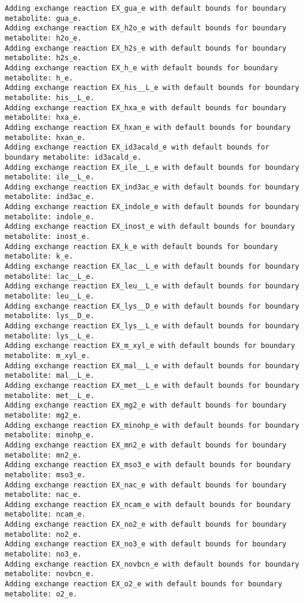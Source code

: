 \documentclass[
  letterpaper,
  DIV=11,
  numbers=noendperiod]{scrartcl}
\begin{document}
\begin{verbatim}
Adding exchange reaction EX_gua_e with default bounds for boundary metabolite: gua_e.
Adding exchange reaction EX_h2o_e with default bounds for boundary metabolite: h2o_e.
Adding exchange reaction EX_h2s_e with default bounds for boundary metabolite: h2s_e.
Adding exchange reaction EX_h_e with default bounds for boundary metabolite: h_e.
Adding exchange reaction EX_his__L_e with default bounds for boundary metabolite: his__L_e.
Adding exchange reaction EX_hxa_e with default bounds for boundary metabolite: hxa_e.
Adding exchange reaction EX_hxan_e with default bounds for boundary metabolite: hxan_e.
Adding exchange reaction EX_id3acald_e with default bounds for boundary metabolite: id3acald_e.
Adding exchange reaction EX_ile__L_e with default bounds for boundary metabolite: ile__L_e.
Adding exchange reaction EX_ind3ac_e with default bounds for boundary metabolite: ind3ac_e.
Adding exchange reaction EX_indole_e with default bounds for boundary metabolite: indole_e.
Adding exchange reaction EX_inost_e with default bounds for boundary metabolite: inost_e.
Adding exchange reaction EX_k_e with default bounds for boundary metabolite: k_e.
Adding exchange reaction EX_lac__L_e with default bounds for boundary metabolite: lac__L_e.
Adding exchange reaction EX_leu__L_e with default bounds for boundary metabolite: leu__L_e.
Adding exchange reaction EX_lys__D_e with default bounds for boundary metabolite: lys__D_e.
Adding exchange reaction EX_lys__L_e with default bounds for boundary metabolite: lys__L_e.
Adding exchange reaction EX_m_xyl_e with default bounds for boundary metabolite: m_xyl_e.
Adding exchange reaction EX_mal__L_e with default bounds for boundary metabolite: mal__L_e.
Adding exchange reaction EX_met__L_e with default bounds for boundary metabolite: met__L_e.
Adding exchange reaction EX_mg2_e with default bounds for boundary metabolite: mg2_e.
Adding exchange reaction EX_minohp_e with default bounds for boundary metabolite: minohp_e.
Adding exchange reaction EX_mn2_e with default bounds for boundary metabolite: mn2_e.
Adding exchange reaction EX_mso3_e with default bounds for boundary metabolite: mso3_e.
Adding exchange reaction EX_nac_e with default bounds for boundary metabolite: nac_e.
Adding exchange reaction EX_ncam_e with default bounds for boundary metabolite: ncam_e.
Adding exchange reaction EX_no2_e with default bounds for boundary metabolite: no2_e.
Adding exchange reaction EX_no3_e with default bounds for boundary metabolite: no3_e.
Adding exchange reaction EX_novbcn_e with default bounds for boundary metabolite: novbcn_e.
Adding exchange reaction EX_o2_e with default bounds for boundary metabolite: o2_e.

\end{verbatim}
\end{document}
